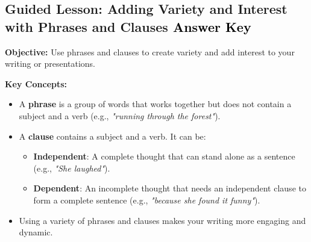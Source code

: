 \documentclass[12pt]{article}
\title{}
\date{}
\begin{document}
\subsection*{Guided Lesson: Adding Variety and Interest with Phrases and Clauses \textcolor{black}{Answer Key}}
\onehalfspacing

\begin{tcolorbox}[colframe=black!40, colback=gray!5, 
coltitle=black, colbacktitle=black!20, fonttitle=\bfseries\Large, 
title=Learning Objective, halign title=center, left=5pt, right=5pt, top=5pt, bottom=15pt]
\textbf{Objective:} Use phrases and clauses to create variety and add interest to your writing or presentations.
\end{tcolorbox}

\vspace{1em}

\begin{tcolorbox}[colframe=black!60, colback=white, 
coltitle=black, colbacktitle=black!15, fonttitle=\bfseries\Large, 
title=Key Concepts and Vocabulary, halign title=center, left=10pt, right=10pt, top=10pt, bottom=15pt]
\textbf{Key Concepts:}
\begin{itemize}
    \item A \textbf{phrase} is a group of words that works together but does not contain a subject and a verb (e.g., \textit{"running through the forest"}).
    \item A \textbf{clause} contains a subject and a verb. It can be:
    \begin{itemize}
        \item \textbf{Independent}: A complete thought that can stand alone as a sentence (e.g., \textit{"She laughed"}).
        \item \textbf{Dependent}: An incomplete thought that needs an independent clause to form a complete sentence (e.g., \textit{"because she found it funny"}).
    \end{itemize}
    \item Using a variety of phrases and clauses makes your writing more engaging and dynamic.
\end{itemize}
\end{tcolorbox}

\vspace{1em}
\end{document}
